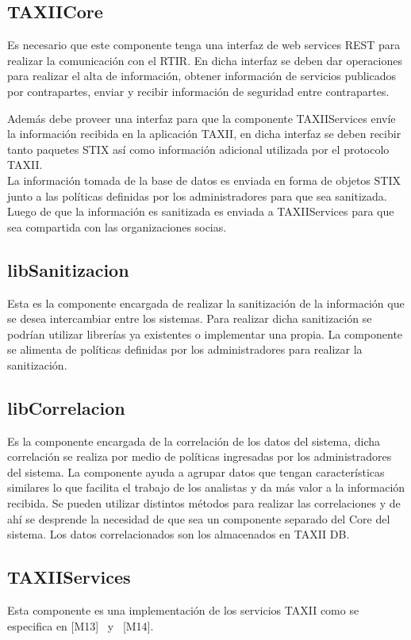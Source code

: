 	\subsection{TAXIICore}
	Es necesario que este componente tenga una interfaz de web services REST para realizar la
		comunicación con el RTIR. En dicha interfaz se deben dar operaciones para realizar el alta de información, obtener
		información de servicios publicados por contrapartes, enviar y recibir información de seguridad entre contrapartes.\\
		\bigskip

	Además debe proveer una interfaz para que la componente TAXIIServices envíe la información
		recibida en la aplicación TAXII, en dicha interfaz se deben recibir tanto paquetes STIX así como información adicional
		utilizada por el protocolo TAXII. \\
	\bigskip	
	La información tomada de la base de datos es enviada en forma de objetos STIX junto a las
		políticas definidas por los administradores para que sea sanitizada. Luego de que la información es sanitizada es
		enviada a TAXIIServices para que sea compartida con las organizaciones socias.
	
	\subsection{libSanitizacion}
	Esta es la componente encargada de realizar la sanitización de la información que se desea
		intercambiar entre los sistemas. Para realizar dicha sanitización se podrían utilizar librerías ya existentes o implementar una
		propia. La componente se alimenta de políticas definidas por los administradores para realizar la
		sanitización.
	
	\subsection{libCorrelacion}
	Es la componente encargada de la correlación de los datos del sistema, dicha correlación se
		realiza por medio de políticas ingresadas por los administradores del sistema. La componente ayuda a agrupar datos que
		tengan características similares lo que facilita el trabajo de los analistas y da más valor a la información recibida.
		Se pueden utilizar distintos métodos para realizar las correlaciones y de ahí se desprende la necesidad de que sea un
		componente separado del Core del sistema. Los datos correlacionados son los almacenados en TAXII DB.
	
	\subsection{TAXIIServices}
	Esta componente es una implementación de los servicios TAXII como se especifica en [M13] \ y
		\ [M14]. 
	
